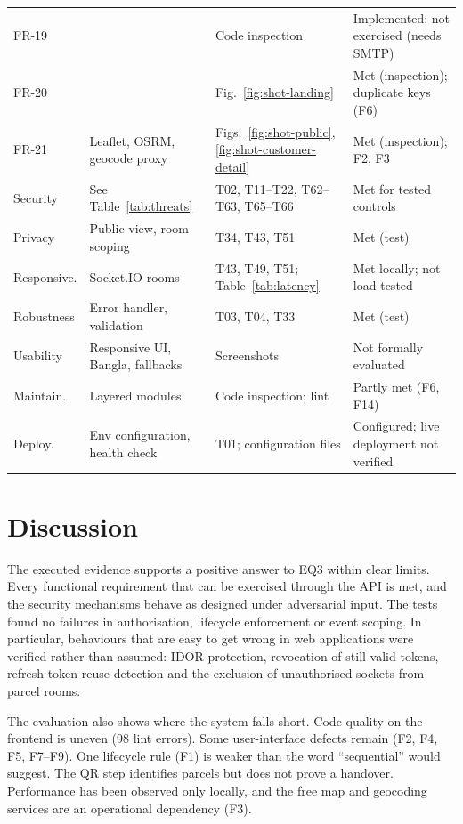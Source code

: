 \begin{longtable}{@{}P{1.9cm}P{4.3cm}P{3.8cm}P{3.6cm}@{}}
FR-19 &  & Code inspection & Implemented; not exercised (needs SMTP) \\
FR-20 &  & Fig.~\ref{fig:shot-landing} & Met (inspection); duplicate keys (F6) \\
FR-21 & Leaflet, OSRM, geocode proxy & Figs.~\ref{fig:shot-public}, \ref{fig:shot-customer-detail} & Met (inspection); F2, F3 \\
\midrule
Security & See Table~\ref{tab:threats} & T02, T11--T22, T62--T63, T65--T66 & Met for tested controls \\
Privacy & Public view, room scoping & T34, T43, T51 & Met (test) \\
Responsive. & Socket.IO rooms & T43, T49, T51; Table~\ref{tab:latency} & Met locally; not load-tested \\
Robustness & Error handler, validation & T03, T04, T33 & Met (test) \\
Usability & Responsive UI, Bangla, fallbacks & Screenshots & Not formally evaluated \\
Maintain. & Layered modules & Code inspection; lint & Partly met (F6, F14) \\
Deploy. & Env configuration, health check & T01; configuration files & Configured; live deployment not verified \\
\bottomrule
\end{longtable}

\section{Discussion}
\label{sec:discussion}

The executed evidence supports a positive answer to EQ3 within clear limits. Every functional requirement that can be exercised through the API is met, and the security mechanisms behave as designed under adversarial input. The tests found no failures in authorisation, lifecycle enforcement or event scoping. In particular, behaviours that are easy to get wrong in web applications were verified rather than assumed: IDOR protection, revocation of still-valid tokens, refresh-token reuse detection and the exclusion of unauthorised sockets from parcel rooms.

The evaluation also shows where the system falls short. Code quality on the frontend is uneven (98 lint errors). Some user-interface defects remain (F2, F4, F5, F7--F9). One lifecycle rule (F1) is weaker than the word ``sequential'' would suggest. The QR step identifies parcels but does not prove a handover. Performance has been observed only locally, and the free map and geocoding services are an operational dependency (F3).

